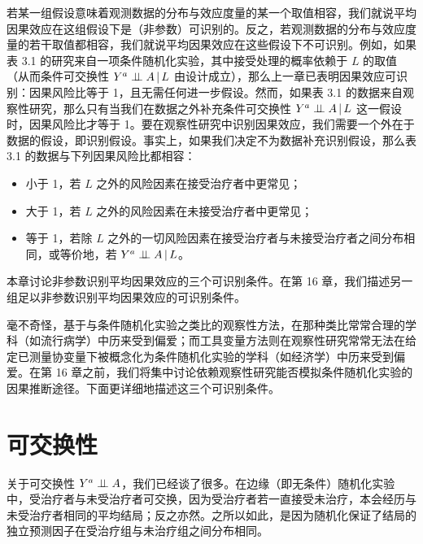 \renewcommand{\FPname}{精要（Fine Point）}
\begin{finepoint}[因果效应的可识别性]
若某一组假设意味着观测数据的分布与效应度量的某一个取值相容，我们就说平均因果效应在这组假设下是（非参数）可识别的。反之，若观测数据的分布与效应度量的若干取值都相容，我们就说平均因果效应在这些假设下不可识别。例如，如果表 3.1 的研究来自一项条件随机化实验，其中接受处理的概率依赖于 $L$ 的取值（从而条件可交换性 $Y^{a}\perp\!\!\!\perp A\,|\, L$ 由设计成立），那么上一章已表明因果效应可识别：因果风险比等于 1，且无需任何进一步假设。然而，如果表 3.1 的数据来自观察性研究，那么只有当我们在数据之外补充条件可交换性 $Y^{a}\perp\!\!\!\perp A\,|\, L$ 这一假设时，因果风险比才等于 1。要在观察性研究中识别因果效应，我们需要一个外在于数据的假设，即识别假设。事实上，如果我们决定不为数据补充识别假设，那么表 3.1 的数据与下列因果风险比都相容：

\begin{itemize}
\item 小于 1，若 $L$ 之外的风险因素在接受治疗者中更常见；
\item 大于 1，若 $L$ 之外的风险因素在未接受治疗者中更常见；
\item 等于 1，若除 $L$ 之外的一切风险因素在接受治疗者与未接受治疗者之间分布相同，或等价地，若 $Y^{a}\perp\!\!\!\perp A\,|\, L$。
\end{itemize}

本章讨论非参数识别平均因果效应的三个可识别条件。在第 16 章，我们描述另一组足以非参数识别平均因果效应的可识别条件。
\end{finepoint}
\renewcommand{\FPname}{精要}

毫不奇怪，基于与条件随机化实验之类比的观察性方法，在那种类比常常合理的学科（如流行病学）中历来受到偏爱；而工具变量方法则在观察性研究常常无法在给定已测量协变量下被概念化为条件随机化实验的学科（如经济学）中历来受到偏爱。在第 16 章之前，我们将集中讨论依赖观察性研究能否模拟条件随机化实验的因果推断途径。下面更详细地描述这三个可识别条件。

\section{可交换性}

关于可交换性 $Y^{a}\perp\!\!\!\perp A$，我们已经谈了很多。在边缘（即无条件）随机化实验中，受治疗者与未受治疗者可交换，因为受治疗者若一直接受未治疗，本会经历与未受治疗者相同的平均结局；反之亦然。之所以如此，是因为随机化保证了结局的独立预测因子在受治疗组与未治疗组之间分布相同。


